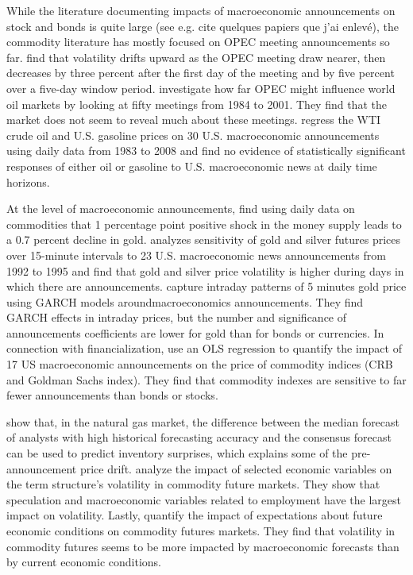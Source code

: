 \documentclass[12pt]{article}
\begin{document}
While the literature documenting impacts of macroeconomic announcements on stock \citep{boyd2005stock,andersen2003micro,hu2017early,scholtus2014speed} and bonds \citep{fleming1997moves,fleming1999price,balduzzi2001economic} is quite large (see e.g. cite quelques papiers que j’ai enlevé), the commodity literature has mostly focused on OPEC meeting announcements so far.  \citet{horan2004implied} find that volatility drifts upward as the OPEC meeting draw nearer, then decreases by three percent after the first day of the meeting and by five percent over a five-day window period. \citet{wirl2004impact} investigate how far OPEC might influence world oil markets by looking at fifty meetings from 1984 to 2001. They find that the market does not seem to reveal much about these meetings. \citet{kilian2011energy} regress the WTI crude oil and U.S. gasoline prices on 30 U.S. macroeconomic announcements using daily data from 1983 to 2008 and find no evidence of statistically significant responses of either oil or gasoline to U.S. macroeconomic news at daily time horizons.


At the level of macroeconomic announcements, \citet{frankel1985commodity} find using daily data on commodities that 1 percentage point positive shock in the money supply leads to a 0.7 percent decline in gold. \citet{christie2000macroeconomics} analyzes sensitivity of gold and silver futures prices over 15-minute intervals to 23 U.S. macroeconomic news announcements from 1992 to 1995 and find that gold and silver price volatility is higher during days in which there are announcements. \citet{cai2001moves} capture intraday patterns of 5 minutes gold price using GARCH models aroundmacroeconomics announcements. They find GARCH effects in intraday prices, but the number and significance of announcements coefficients are lower for gold than for bonds or currencies. In connection with financialization, \citet{hess2008commodity} use an OLS regression to quantify the impact of 17 US macroeconomic announcements on the price of commodity indices (CRB and Goldman Sachs index). They find that commodity indexes are sensitive to far fewer announcements than bonds or stocks.

\citet{gu2018drives} show that, in the natural gas market, the difference between the median forecast of analysts with high historical forecasting accuracy and the consensus forecast can be used to predict inventory surprises, which explains some of the pre-announcement price drift.  \citet{hollstein2020volatility} analyze the impact of selected economic variables on the term structure’s volatility in commodity future markets. They show that speculation and macroeconomic variables related to employment have the largest impact on volatility. Lastly, \citet{ye2021macroeconomic} quantify the impact of expectations about future economic conditions on commodity futures markets. They find that volatility in commodity futures seems to be more impacted by macroeconomic forecasts than by current economic conditions. 
\end{document}
